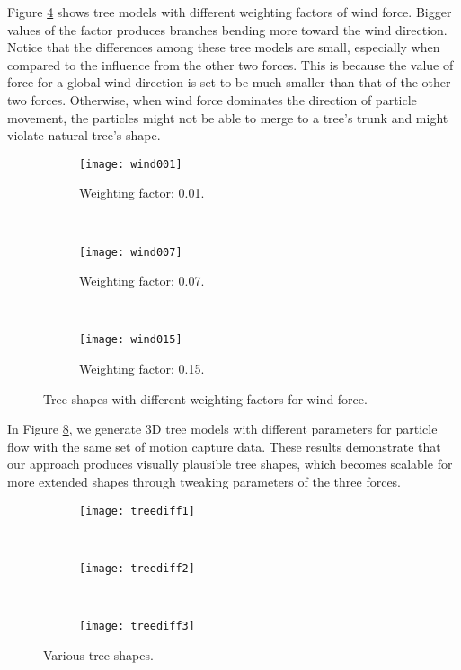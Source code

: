 Figure \ref{fig:windFactor} shows tree models with different weighting factors of wind force. Bigger values of the factor produces branches bending more toward the wind direction. Notice that the differences among these tree models are small, especially when compared to the influence from the other two forces. This is because the value of force for a global wind direction is set to be much smaller than that of the other two forces. Otherwise, when wind force dominates the direction of particle movement, the particles might not be able to merge to a tree's trunk and might violate natural tree's shape. 

\begin{figure}
\centering
        \begin{subfigure}[b]{0.3\textwidth}
                \centering
                \texttt{[image: wind001]}
                \caption{Weighting factor: 0.01.}
                \label{fig:wind001}
        \end{subfigure}
        ~
        \begin{subfigure}[b]{0.3\textwidth}
                \centering
                \texttt{[image: wind007]}
                \caption{Weighting factor: 0.07.}
                \label{fig:wind007}
        \end{subfigure}
        ~
        \begin{subfigure}[b]{0.3\textwidth}
                \centering
                \texttt{[image: wind015]}
                \caption{Weighting factor: 0.15.}
                \label{fig:wind015}
        \end{subfigure}
\caption{Tree shapes with different weighting factors for wind force.}
\label{fig:windFactor}
\end{figure}

In Figure \ref{fig:moreShapes}, we generate 3D tree models with different parameters for particle flow with the same set of motion capture data. These results demonstrate that our approach produces visually plausible tree shapes, which becomes scalable for more extended shapes through tweaking parameters of the three forces. 

\begin{figure}
\centering
        \begin{subfigure}[b]{0.3\textwidth}
                \centering
                \texttt{[image: treediff1]}
                \caption{}
                \label{fig:treediff1}
        \end{subfigure}
        ~
        \begin{subfigure}[b]{0.3\textwidth}
                \centering
                \texttt{[image: treediff2]}
                \caption{}
                \label{fig:treediff2}
        \end{subfigure}
        ~
        \begin{subfigure}[b]{0.3\textwidth}
                \centering
                \texttt{[image: treediff3]}
                \caption{}
                \label{fig:treediff3}
        \end{subfigure}
\caption{Various tree shapes.}
\label{fig:moreShapes}
\end{figure}

